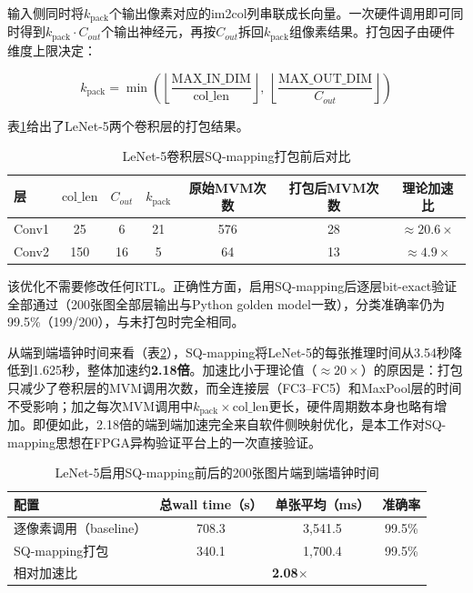 \documentclass[12pt, a4paper]{article}
\begin{document}
输入侧同时将$k_{\text{pack}}$个输出像素对应的im2col列串联成长向量。一次硬件调用即可同时得到$k_{\text{pack}}\cdot C_{out}$个输出神经元，再按$C_{out}$拆回$k_{\text{pack}}$组像素结果。打包因子由硬件维度上限决定：

\begin{equation}
	k_{\text{pack}} = \min\!\left(\left\lfloor\frac{\text{MAX\_IN\_DIM}}{\text{col\_len}}\right\rfloor,\ \left\lfloor\frac{\text{MAX\_OUT\_DIM}}{C_{out}}\right\rfloor\right)
\end{equation}

表\ref{tab:sqmapping}给出了LeNet-5两个卷积层的打包结果。

\begin{table}[H]
	\centering
	\caption{LeNet-5卷积层SQ-mapping打包前后对比}
	\label{tab:sqmapping}
	\small
	\begin{tabular}{lcccccc}
		\toprule
		层 & $\text{col\_len}$ & $C_{out}$ & $k_{\text{pack}}$ & 原始MVM次数 & 打包后MVM次数 & 理论加速比 \\
		\midrule
		Conv1 & 25 & 6 & 21 & 576 & 28 & $\approx 20.6\times$ \\
		Conv2 & 150 & 16 & 5 & 64 & 13 & $\approx 4.9\times$ \\
		\bottomrule
	\end{tabular}
\end{table}

该优化不需要修改任何RTL。正确性方面，启用SQ-mapping后逐层bit-exact验证全部通过（200张图全部层输出与Python golden model一致），分类准确率仍为99.5\%（199/200），与未打包时完全相同。

从端到端墙钟时间来看（表\ref{tab:sqmapping_walltime}），SQ-mapping将LeNet-5的每张推理时间从3.54秒降低到1.625秒，整体加速约\textbf{2.18倍}。加速比小于理论值（$\approx 20\times$）的原因是：打包只减少了卷积层的MVM调用次数，而全连接层（FC3--FC5）和MaxPool层的时间不受影响；加之每次MVM调用中$k_{\text{pack}}\times\text{col\_len}$更长，硬件周期数本身也略有增加。即便如此，2.18倍的端到端加速完全来自软件侧映射优化，是本工作对SQ-mapping思想在FPGA异构验证平台上的一次直接验证。

\begin{table}[H]
	\centering
	\caption{LeNet-5启用SQ-mapping前后的200张图片端到端墙钟时间}
	\label{tab:sqmapping_walltime}
	\begin{tabular}{lccc}
		\toprule
		配置 & 总wall time（s） & 单张平均（ms） & 准确率 \\
		\midrule
		逐像素调用（baseline） & 708.3 & 3,541.5 & 99.5\% \\
		SQ-mapping打包 & 340.1 & 1,700.4 & 99.5\% \\
		\midrule
		相对加速比 & \multicolumn{3}{c}{\textbf{2.08}$\times$} \\
		\bottomrule
	\end{tabular}
\end{table}
\end{document}
